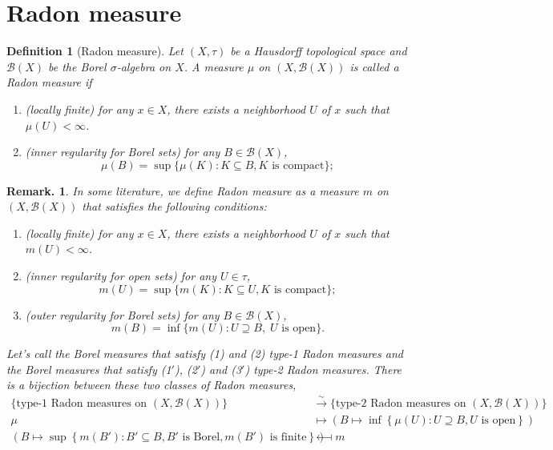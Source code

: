 \documentclass{report}
\newtheorem{definition}{Definition}[section]
\theoremstyle{nonumberplain}
\newtheorem{remark}{Remark.}
\begin{document}
\section{Radon measure}
\begin{definition}[Radon measure]
	Let $(X,\tau)$ be a Hausdorff topological space and $\mathcal{B}(X)$ be the Borel $\sigma$-algebra on $X$. A measure $\mu$ on $(X,\mathcal{B}(X))$ is called a \emph{Radon measure} if
	\begin{enumerate}[(1)]
		\item (locally finite) for any $x\in X$, there exists a neighborhood $U$ of $x$ such that $\mu(U)<\infty$.
		\item (inner regularity for Borel sets) for any $B\in\mathcal{B}(X)$,
		\[
		\mu(B)=\sup\{\mu(K):K\subseteq B,K\text{ is compact}\};
		\]
	
	\end{enumerate}
\end{definition}
\begin{remark}
	In some literature, we define Radon measure as a measure $m$ on $(X,\mathcal{B}(X))$ that satisfies the following conditions:
	\begin{enumerate}[(1$'$)]
		\item (locally finite) for any $x\in X$, there exists a neighborhood $U$ of $x$ such that $m(U)<\infty$.
		\item (inner regularity for open sets) for any $U\in\tau$,
		\[
		m(U)=\sup\{m(K):K\subseteq U,K\text{ is compact}\};
		\]
		\item (outer regularity for Borel sets) for any $B\in\mathcal{B}(X)$,
		\[
		m(B)=\inf\{m(U):U\supseteq B,\;U\text{ is open}\}.
		\]
	\end{enumerate}
	Let's call the Borel measures that satisfy (1) and (2) \emph{type-1 Radon measures} and the Borel measures that satisfy (1$'$), (2$'$) and (3$'$) \emph{type-2 Radon measures}. There is a bijection between these two classes of Radon measures, \begin{align*}
		\{\text{type-1 Radon measures on }(X,\mathcal{B}(X))\}&\stackrel{\sim}{\longrightarrow}\{\text{type-2 Radon measures on }(X,\mathcal{B}(X))\}\\
		\mu &\longmapsto \left(B \longmapsto \inf\left\{\mu(U):U \supseteq B, U \text{ is open}\right\}\right)\\
		(B \longmapsto \sup\left\{m(B') : B' \subseteq B, B' \text{ is Borel}, m(B')\text{ is finite}\right\})& \longmapsfrom m
	\end{align*}
\end{remark}
\end{document}
